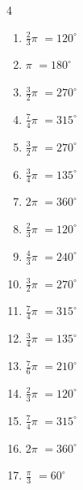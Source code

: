 \begin{multicols}{4}
\begin{enumerate}
  \item $\displaystyle \frac{2}{3}\pi$
        $\displaystyle =120^{\circ}$

  \item $\displaystyle \pi$
        $\displaystyle =180^{\circ}$

  \item $\displaystyle \frac{3}{2}\pi$
        $\displaystyle =270^{\circ}$

  \item $\displaystyle \frac{7}{4}\pi$
        $\displaystyle =315^{\circ}$

  \item $\displaystyle \frac{3}{2}\pi$
        $\displaystyle =270^{\circ}$

  \item $\displaystyle \frac{3}{4}\pi$
        $\displaystyle =135^{\circ}$

  \item $\displaystyle 2\pi$
        $\displaystyle =360^{\circ}$

  \item $\displaystyle \frac{2}{3}\pi$
        $\displaystyle =120^{\circ}$

  \item $\displaystyle \frac{4}{3}\pi$
        $\displaystyle =240^{\circ}$

\columnbreak %

  \item $\displaystyle \frac{3}{2}\pi$
        $\displaystyle =270^{\circ}$

  \item $\displaystyle \frac{7}{4}\pi$
        $\displaystyle =315^{\circ}$

  \item $\displaystyle \frac{3}{4}\pi$
        $\displaystyle =135^{\circ}$

  \item $\displaystyle \frac{7}{6}\pi$
        $\displaystyle =210^{\circ}$

  \item $\displaystyle \frac{2}{3}\pi$
        $\displaystyle =120^{\circ}$

  \item $\displaystyle \frac{7}{4}\pi$
        $\displaystyle =315^{\circ}$

  \item $\displaystyle 2\pi$
        $\displaystyle =360^{\circ}$

  \item $\displaystyle \frac{\pi}{3}$
        $\displaystyle =60^{\circ}$


\end{enumerate}
\end{multicols}
